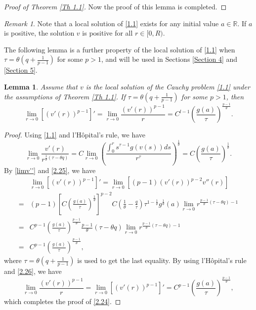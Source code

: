\documentclass[a4paper,11pt]{amsart}
\theoremstyle{plain}
\newtheorem{Lemma}{Lemma}[section]
\theoremstyle{remark}
\newtheorem{remark}{Remark}
\numberwithin{equation}{section}
\numberwithin{figure}{section}
\numberwithin{remark}{section}
\begin{document}
\begin{sloppypar}
\begin{proof}[Proof of Theorem \ref{Th 1.1}]
	Now the proof of this lemma is completed.
	\end{proof}
\begin{remark}	
Note that a local solution of \eqref{1.1} exists for any initial value $a\in \mathbb{R}$. If $a$ is positive, the solution $v$ is positive for all $r\in [0, R)$.
\end{remark}

The following lemma is a further property of the local solution of \eqref{1.1} when $\tau = \theta (q+\frac{1}{p-1})$ for some $p>1$, and will be used in Sections \ref{Section 4} and \ref{Section 5}.
\begin{Lemma}\label{Lemma 2.2}
Assume that $v$ is the local solution of the Cauchy problem \eqref{1.1} under the assumptions of Theorem \ref{Th 1.1}. If $\tau = \theta (q+\frac{1}{p-1})$ for some $p>1$, then
\begin{equation}\label{2.24}
\lim_{r\to 0} \left[ (v'(r))^{p-1} \right] ' = \lim_{r\to 0} \frac{(v'(r))^{p-1}}{r} = C^{l-1} \left (\frac{g(a)}{\tau}\right)^{\frac{p-1}{\theta}}.
\end{equation}
\end{Lemma}
\begin{proof}
Using \eqref{1.1} and l'H\^opital's rule, we have
\begin{equation}\label{2.25}
\lim_{r\to 0} \frac{v'(r)}{r^{\frac{1}{\theta}(\tau - \theta q)}} = C \lim_{r\to 0} \left ( \frac{\int_0^r s^{\tau-1}g(v(s))ds}{r^\tau} \right )^{\frac{1}{\theta}} = C \left( \frac{g(a)}{\tau}\right )^{\frac{1}{\theta}}.
\end{equation}
By \eqref{limv''} and \eqref{2.25}, we have
\begin{equation}\label{2.26}
\begin{aligned}
    & \lim_{r\to 0} \left[ (v'(r))^{p-1} \right] '
=   \lim_{r\to 0} \left[(p-1)(v'(r))^{p-2}v''(r) \right] \\
= &  (p-1) \left[ C\left(\frac{g(a)}{\tau}\right)^{\frac{1}{\theta}}\right]^{p-2}C\left(\frac{1}{\theta} - \frac{q}{\tau}\right)\tau^{1-\frac{1}{\theta}}g^{\frac{1}{\theta}}(a)
\lim_{r\to 0} r^{\frac{p-1}{\theta}(\tau-\theta q)-1} \\
= & C^{p-1} \left( \frac{g(a)}{\tau} \right)^{\frac{p-1}{\theta}} \frac{p-1}{\theta} (\tau-\theta q) \lim_{r\to 0}r^{\frac{p-1}{\theta}(\tau-\theta q)-1}\\
= & C^{p-1} \left (\frac{g(a)}{\tau}\right)^{\frac{p-1}{\theta}},
\end{aligned}
\end{equation}
where $\tau = \theta(q+\frac{1}{p-1})$ is used to get the last equality. By using l'H\^opital's rule and \eqref{2.26}, we have
\begin{equation}\label{2.27}
\lim_{r\to 0} \frac{(v'(r))^{p-1}}{r} = \lim_{r\to 0} \left[ (v'(r))^{p-1} \right] ' = C^{p-1} \left (\frac{g(a)}{\tau}\right)^{\frac{p-1}{\theta}},
\end{equation}
which completes the proof of \eqref{2.24}.
\end{proof}



\end{sloppypar}
\end{document}
